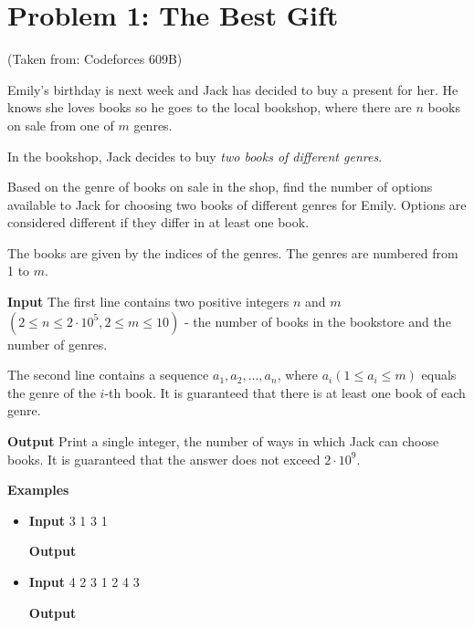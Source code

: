 \normalfont\documentclass[letterpaper,11pt]{article}
\begin{document}
\section*{Problem 1: The Best Gift}
(Taken from: Codeforces 609B)

Emily's birthday is next week and Jack has decided to buy a present for her. He knows she loves books so he goes to the local bookshop, where there are $n$ books on sale from one of $m$ genres.

In the bookshop, Jack decides to buy \textit{two books of different genres}.

Based on the genre of books on sale in the shop, find the number of options available to Jack for choosing two books of different genres for Emily. Options are considered different if they differ in at least one book.

The books are given by the indices of the genres. The genres are numbered from 1 to $m$.

\textbf{Input} \newline
The first line contains two positive integers $n$ and $m$ $(2 \leq n \leq 2 \cdot 10^5, 2 \leq m \leq 10)$ - the number of books in the bookstore and the number of genres.

The second line contains a sequence $a_1, a_2, \ldots, a_n$, where $a_i (1 \leq a_i \leq m)$ equals the genre of the $i$-th book. It is guaranteed that there is at least one book of each genre.

\textbf{Output} \newline
Print a single integer, the number of ways in which Jack can choose books. It is guaranteed that the answer does not exceed $2 \cdot 10^9$.

\textbf{Examples} \newline
\begin{itemize}
\item \textbf{Input}  3  1 3 1

\textbf{Output} 

\item \textbf{Input}  4  2 3 1 2 4 3

\textbf{Output} 
\end{itemize}

\newpage
\end{document}
